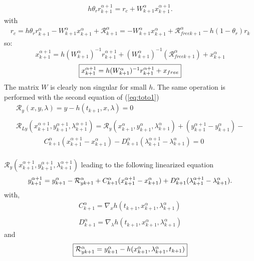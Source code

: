 \begin{equation}
   \begin{array}{l}
 h \theta _r  r^{\alpha+1}_{k+1} = r_c + W^{\alpha}_{k+1} x^{\alpha+1}_{k+1}
 .\label{eq:NL211} 
 \end{array}
\end{equation}
with 
\begin{equation}
   \begin{array}{l}
r_c = h \theta _r r^{\alpha}_{k+1} - W^{\alpha}_{k+1} x^{\alpha}_{k+1} + \mathcal R
^{\alpha}_{k+1}=- W^{\alpha}_{k+1} x^{\alpha}_{k+1} + \mathcal R_{free k+1} ^{\alpha} - h(1-\theta_r)r_k
 \end{array}
   \end{equation}
so:
\[x^{\alpha+1}_{k+1} = h(W^{\alpha}_{k+1})^{-1}r^{\alpha+1}_{k+1} +(W^{\alpha}_{k+1})^{-1}(\mathcal R_{free k+1} ^{\alpha})+x^{\alpha}_{k+1}\]
\[\fbox{$x^{\alpha+1}_{k+1} = h(W^{\alpha}_{k+1})^{-1}r^{\alpha+1}_{k+1} +x_{free}$}\]
The matrix $W$ is clearly non singular for small $h$.
The same operation is performed with the second equation of (\ref{eq:toto1})
\begin{equation}
   \label{eq:NL29}
   \begin{array}{l}
      \mathcal R_y(x,y,\lambda)=y-h(t_{k+1},x,\lambda) =0\\ \\
      \mathcal R_{Ly}(x^{\alpha+1}_{k+1},y^{\alpha+1}_{k+1},\lambda^{\alpha+1}_{k+1}) = \mathcal
      R_{y}(x^{\alpha}_{k+1},y^{\alpha}_{k+1},\lambda^{\alpha}_{k+1}) +
      (y^{\alpha+1}_{k+1}-y^{\alpha}_{k+1})- \\ \qquad \qquad
      C^{\alpha}_{k+1}(x^{\alpha+1}_{k+1}-x^{\alpha}_{k+1}) - D^{\alpha}_{k+1}(\lambda^{\alpha+1}_{k+1}-\lambda^{\alpha}_{k+1})=0\\
      
 \end{array}
\end{equation}

$\mathcal R_y(x^{\alpha+1}_{k+1},y^{\alpha+1}_{k+1},\lambda^{\alpha+1}_{k+1})$ leading to the following linearized equation
\begin{equation}
  y^{\alpha+1}_{k+1} =  y^{\alpha}_{k+1}
  -\mathcal R^{\alpha}_{yk+1}+ \\
  C^{\alpha}_{k+1}(x^{\alpha+1}_{k+1}-x^{\alpha}_{k+1}) +
  D^{\alpha}_{k+1}(\lambda^{\alpha+1}_{k+1}-\lambda^{\alpha}_{k+1}). \label{eq:NL211y}
\end{equation}
with,
\begin{equation}
     \begin{array}{l}
  C^{\alpha}_{k+1} = \nabla_xh(t_{k+1}, x^{\alpha}_{k+1},\lambda^{\alpha}_{k+1} ) \\ \\
  D^{\alpha}_{k+1} = \nabla_{\lambda}h(t_{k+1}, x^{\alpha}_{k+1},\lambda^{\alpha}_{k+1})
 \end{array}
\end{equation}
and
\begin{equation}\fbox{$
\mathcal R^{\alpha}_{yk+1} = y^{\alpha}_{k+1} - h(x^{\alpha}_{k+1},\lambda^{\alpha}_{k+1},t_{k+1})$}
 \end{equation}


